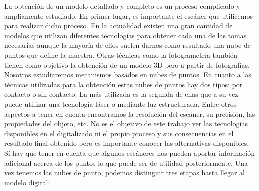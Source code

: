 La obtención de un modelo detallado y completo es un proceso complicado y ampliamente estudiado. En primer lugar, es importante el escáner que utilicemos para realizar dicho proceso. En la actualidad existen una gran cantidad de modelos que utilizan diferentes tecnologías para obtener cada una de las tomas necesarias aunque la mayoría de ellos suelen darnos como resultado una nube de puntos que define la muestra. Otras técnicas como la fotogrametría también tienen como objetivo la obtención de un modelo 3D pero a partir de fotografías. Nosotros estudiaremos mecanismos basados en nubes de puntos. En cuanto a las técnicas utilizadas para la obtención estas nubes de puntos hay dos tipos: por contacto o sin contacto. La más utilizada es la segunda de ellas que a su vez puede utilizar una tecnología láser o mediante luz estructurada. Entre otros aspectos a tener en cuenta encontramos la resolución del escáner, su precisión, las propiedades del objeto, etc. No es el objetivo de este trabajo ver las tecnologías disponibles en el digitalizado ni el propio proceso y sus consecuencias en el resultado final obtenido pero es importante conocer las alternativas disponibles. Sí hay que tener en cuenta que algunos escáneres nos pueden aportar información adicional acerca de los puntos lo que puede ser de utilidad posteriormente. Una vez tenemos las nubes de punto, podemos distinguir tres etapas hasta llegar al modelo digital:
